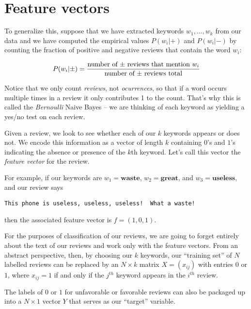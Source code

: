 \documentclass[
  oneside]{scrbook}
\renewcommand{\rm}{}
\begin{document}
\hypertarget{feature-vectors}{%
\section{Feature vectors}\label{feature-vectors}}

To generalize this, suppose that we have extracted keywords
\(w_1,\ldots, w_k\) from our data and we have computed the empirical
values \(P(w_{i}|+)\) and \(P(w_{i}|-)\) by counting the fraction of
positive and negative reviews that contain the word \(w_{i}\):

\[
P(w_{i}|\pm) = \frac{\hbox{\rm number of $\pm$ reviews that mention $w_{i}$}}{\hbox{\rm number of $\pm$ reviews total}}
\]

Notice that we only count \emph{reviews}, not \emph{ocurrences}, so that
if a word occurs multiple times in a review it only contributes 1 to the
count. That's why this is called the \emph{Bernoulli} Naive Bayes -- we
are thinking of each keyword as yielding a yes/no test on each review.

Given a review, we look to see whether each of our \(k\) keywords
appears or does not. We encode this information as a vector of length
\(k\) containing \(0\)'s and \(1\)'s indicating the absence or presence
of the \(k\)th keyword. Let's call this vector the \emph{feature vector}
for the review.

For example, if our keywords are \(w_1=\mathbf{waste}\),
\(w_2=\mathbf{great}\), and \(w_3=\mathbf{useless}\), and our review
says

\begin{verbatim}
This phone is useless, useless, useless!  What a waste!
\end{verbatim}

then the associated feature vector is \(f=(1,0,1)\).

For the purposes of classification of our reviews, we are going to
forget entirely about the text of our reviews and work only with the
feature vectors. From an abstract perspective, then, by choosing our
\(k\) keywords, our ``training set'' of \(N\) labelled reviews can be
replaced by an \(N\times k\) matrix \(X=(x_{ij})\) with entries \(0\) or
\(1\), where \(x_{ij}=1\) if and only if the \(j^{th}\) keyword appears
in the \(i^{th}\) review.

The labels of \(0\) or \(1\) for unfavorable or favorable reviews can
also be packaged up into a \(N\times 1\) vector \(Y\) that serves as our
``target'' variable.
\end{document}
